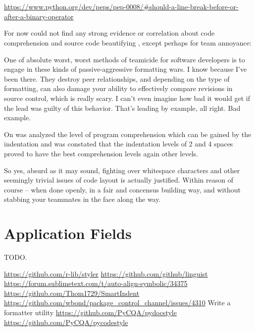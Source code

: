 \section{}

\url{https://www.python.org/dev/peps/pep-0008/#should-a-line-break-before-or-after-a-binary-operator}



For now could not find any strong evidence or correlation about code
comprehension and source code beautifying \cite{improvingCodeReadability},
except perhaps for team annoyance:

\begin{citacao}
One of absolute worst, worst methods of teamicide for software developers is to engage
in these kinds of passive-aggressive formatting wars. I know because I've been there.
They destroy peer relationships, and depending on the type of formatting, can also damage
your ability to effectively compare revisions in source control, which is really scary.
I can't even imagine how bad it would get if the lead was guilty of this behavior. That's
leading by example, all right. Bad example. \cite{Atwood}
\end{citacao}

On  was analyzed the level of program
comprehension which can be gained by the indentation and was constated that
the indentation levels of 2 and 4 spaces proved to have the best
comprehension levels again other levels.

\begin{citacao}
So yes, absurd as it may sound, fighting over whitespace characters and other seemingly
trivial issues of code layout is actually justified. Within reason of course -- when done
openly, in a fair and concensus building way, and without stabbing your teammates in the
face along the way. \cite{Atwood}
\end{citacao}



\section{Application Fields}

TODO.

\url{https://github.com/r-lib/styler}
\url{https://github.com/github/linguist}
\url{https://forum.sublimetext.com/t/auto-align-symbolic/34375}
\url{https://github.com/Thom1729/SmartIndent}
\url{https://github.com/wbond/package_control_channel/issues/4310} Write a formatter utility
\url{https://github.com/PyCQA/pydocstyle}
\url{https://github.com/PyCQA/pycodestyle}



